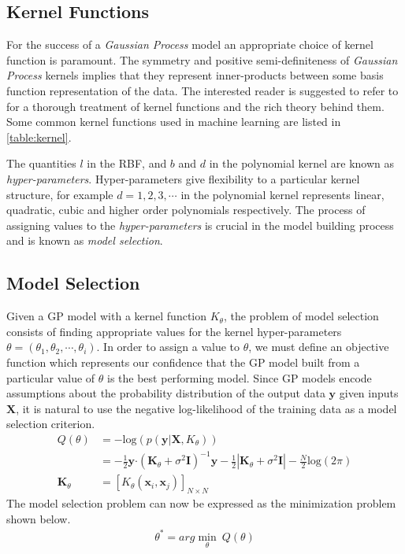 \subsection{Kernel Functions}

For the success of a \emph{Gaussian Process} model an appropriate choice of kernel function is 
paramount. The symmetry and positive semi-definiteness of \emph{Gaussian Process} kernels implies 
that they represent inner-products between some basis function representation of the data. The 
interested reader is suggested to refer to 
\citet{Berlinet2004,Scholkopf:2001:LKS:559923,hofmann2008} for a thorough treatment of kernel 
functions and the rich theory behind them. Some common kernel functions used in machine learning 
are listed in \cref{table:kernel}. 

The quantities $l$ in the RBF, and $b$ and $d$ in the polynomial kernel are known as 
\emph{hyper-parameters}. Hyper-parameters give flexibility to a particular kernel structure, for 
example $d = 1, 2, 3, \cdots$ in the polynomial kernel represents linear, quadratic, cubic and 
higher order polynomials respectively. The process of assigning values to the 
\emph{hyper-parameters} is crucial in the model building process and is known as 
\emph{model selection}. 

\subsection{Model Selection}\label{sec:gpModelSelection}

Given a GP model with a kernel function $K_\theta$, the problem of model selection consists of 
finding appropriate values for the kernel hyper-parameters 
$\theta = \left(\theta_1, \theta_2, \cdots, \theta_i\right)$. In order to assign a value to 
$\theta$, we must define an objective function which represents our confidence that the GP model 
built from a particular value of $\theta$ is the best performing model. Since GP models encode 
assumptions about the probability distribution of the output data $\mathbf{y}$ given inputs 
$\mathbf{X}$, it is natural to use the negative log-likelihood of the training data as a model 
selection criterion. 
%
\begin{align*}
  Q(\theta) & = - \text{log}(p(\mathbf{y}|\mathbf{X}, K_\theta)) \\
            & = -\frac{1}{2} \mathbf{y}\boldsymbol{\cdot} (\mathbf{K}_\theta + \sigma^{2} \mathbf{I})^{-1} \mathbf{y} - \frac{1}{2}|\mathbf{K}_\theta + \sigma^{2} \mathbf{I}| - \frac{N}{2}\text{log}(2\pi) \\
  \mathbf{K}_\theta & = [K_{\theta}(\mathbf{x}_i, \mathbf{x}_j)]_{N \times N}
\end{align*}
%
The model selection problem can now be expressed as the minimization problem shown below.
%
\begin{align*}
\theta^* = arg\min_{\theta} \ Q(\theta)
\end{align*}

